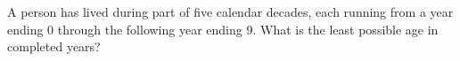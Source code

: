 A person has lived during part of five calendar decades, each running from a year ending 0 through the following year ending 9. What is the least possible age in completed years?
